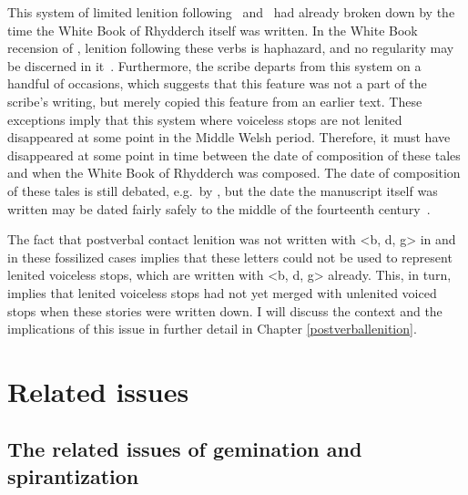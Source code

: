 This system of limited lenition following \ei\ and \oes\ had already broken down by the time the White Book of Rhydderch itself was written. In the White Book recension of , lenition following these verbs is haphazard, and no regularity may be discerned in it~\Autocite[42]{van_sluis_development_2014}. Furthermore, the scribe departs from this system on a handful of occasions, which suggests that this feature was not a part of the scribe's writing, but merely copied this feature from an earlier text. These exceptions imply that this system where voiceless stops are not lenited disappeared at some point in the Middle Welsh period. Therefore, it must have disappeared at some point in time between the date of composition of these tales and when the White Book of Rhydderch was composed. The date of composition of these tales is still debated, e.g.\ by \textcite*{rodway_date_2005}, but the date the manuscript itself was written may be dated fairly safely to the middle of the fourteenth century~\autocite[228]{huws_medieval_2000}. 

The fact that postverbal contact lenition was not written with <b, d, g> in  and  in these fossilized cases implies that these letters could not be used to represent lenited voiceless stops, which are written with <b, d, g> already. This, in turn, implies that lenited voiceless stops had not yet merged with unlenited voiced stops when these stories were written down. I will discuss the context and the implications of this issue in further detail in Chapter \ref{postverballenition}. 




\section{Related issues}
\subsection{The related issues of gemination and spirantization}
\cite{jackson_language_1953,martinet_celtic_1952,schrijver_spirantization_1999,isaac_old-_2004}

